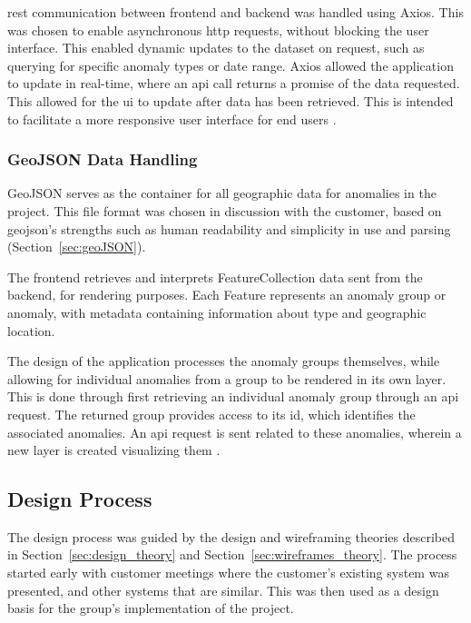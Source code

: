 \acrshort{rest} communication between frontend and backend was handled using Axios. This was chosen to enable asynchronous \acrshort{http} requests, without blocking the user interface. This enabled dynamic updates to the dataset on request, such as querying for specific anomaly types or date range. Axios allowed the application to update in real-time, where an \acrshort{api} call returns a promise of the data requested. This allowed for the \acrshort{ui} to update after data has been retrieved. This is intended to facilitate a more responsive user interface for end users \parencite{geeksforgeeks_axios}.


\subsubsection{GeoJSON Data Handling}
\label{sec:GeoJSON Data Handling}


GeoJSON serves as the container for all geographic data for anomalies in the project. This file format was chosen in discussion with the customer, based on \acrshort{geojson}'s strengths such as human readability and simplicity in use and parsing (Section~\ref{sec:geoJSON}). 

The frontend retrieves and interprets FeatureCollection data sent from the backend, for rendering purposes. Each Feature represents an anomaly group or anomaly, with metadata containing information about type and geographic location. 

The design of the application processes the anomaly groups themselves, while allowing for individual anomalies from a group to be rendered in its own layer. This is done through first retrieving an individual anomaly group through an \acrshort{api} request. The returned group provides access to its \acrshort{id}, which identifies the associated anomalies. An \acrshort{api} request is sent related to these anomalies, wherein a new layer is created visualizing them \parencite{geojson_datatracker}.


\subsection{Design Process}
\label{sec:design_process}


The design process was guided by the design and wireframing theories described in Section~\ref{sec:design_theory} and Section~\ref{sec:wireframes_theory}. The process started early with customer meetings where the customer's existing system was presented, and other systems that are similar. This was then used as a design basis for the group's implementation of the project. 



